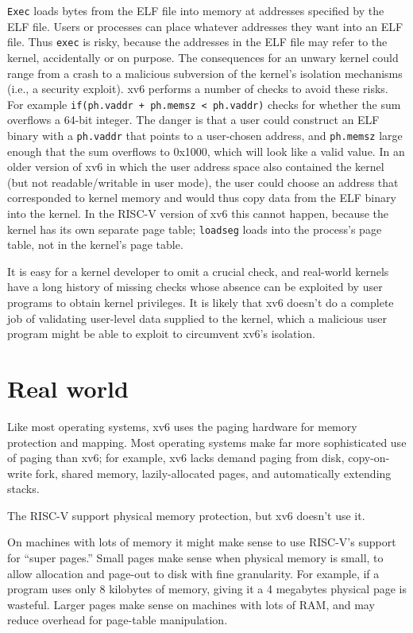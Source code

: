 \lstinline{Exec}
loads bytes from the ELF file into memory at addresses specified by the ELF file.
Users or processes can place whatever addresses they want into an ELF file.
Thus
\lstinline{exec}
is risky, because the addresses in the ELF file may refer to the kernel, accidentally
or on purpose. The consequences for an unwary kernel could range from
a crash to a malicious subversion of the kernel's isolation mechanisms
(i.e., a security exploit).
xv6 performs a number of checks to avoid these risks.
For example
\lstinline{if(ph.vaddr + ph.memsz < ph.vaddr)}
checks for whether the sum overflows a 64-bit integer.
The danger is that a user could construct an ELF binary with a
\lstinline{ph.vaddr}
that points to a user-chosen address,
and
\lstinline{ph.memsz}
large enough that the sum overflows to 0x1000, which will look like a
valid value. In an older version of xv6 in which the user address
space also contained the kernel (but not readable/writable in user
mode), the user could choose an address that corresponded to kernel
memory and would thus copy data from the ELF binary into the kernel.
In the RISC-V version of xv6 this cannot happen, because the kernel has
its own separate page table;
\lstinline{loadseg}
loads into the process's page table, not in the kernel's page table.

It is easy for a kernel developer to omit a crucial check, and
real-world kernels have a long history of missing checks whose absence
can be exploited by user programs to obtain kernel privileges.  It is likely that xv6 doesn't do a complete job of validating
user-level data supplied to the kernel, which a malicious user program might be able to exploit to circumvent xv6's isolation.
\section{Real world}

Like most operating systems, xv6 uses the paging hardware
for memory protection and mapping.
Most operating systems make far more sophisticated
use of paging than xv6; for example, xv6 lacks demand
paging from disk, copy-on-write fork, shared memory,
lazily-allocated pages,
and automatically extending stacks.

The RISC-V support physical memory protection, but xv6 doesn't use it.

On machines with lots of memory
it might make sense to use
RISC-V's support for ``super pages.''
Small pages make sense
when physical memory is small, to allow allocation and page-out to disk
with fine granularity.
For example, if a program
uses only 8 kilobytes of memory, giving it a 4 megabytes physical page is wasteful.
Larger pages make sense on machines with lots of RAM,
and may reduce overhead for page-table manipulation.

